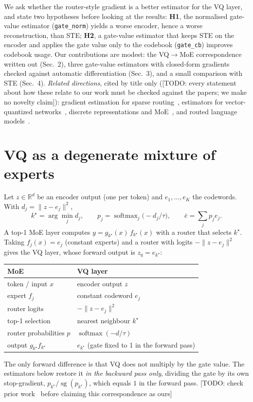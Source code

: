 \documentclass[11pt]{article}
\newcommand{\todo}[1]{{\color{red}[TODO: #1]}}
\newcommand{\sg}{\operatorname{sg}}
\newcommand{\est}[1]{\texttt{#1}}
\begin{document}
We ask whether the router-style gradient is a better estimator for the VQ layer, and state two
hypotheses before looking at the results: \textbf{H1}, the normalised gate-value estimator
(\est{gate\_norm}) yields a worse encoder, hence a worse reconstruction, than STE; \textbf{H2}, a
gate-value estimator that keeps STE on the encoder and applies the gate value only to the codebook
(\est{gate\_cb}) improves codebook usage. Our contributions are modest: the VQ$\to$MoE
correspondence written out (Sec.~2), three gate-value estimators with closed-form gradients checked
against automatic differentiation (Sec.~3), and a small comparison with STE (Sec.~4).
\emph{Related directions}, cited by title only (\todo{every statement about how these relate to our
work must be checked against the papers; we make no novelty claim}): gradient estimation for sparse
routing~\cite{liu2023sparsemixer,liu2024grin,panda2025defaultmoe}, estimators for vector-quantized
networks~\cite{huh2023straightening,fifty2024rotation}, discrete representations and
MoE~\cite{do2024vqmoe,zhong2026rqmoe}, and routed language models~\cite{clark2022unified}.

\section{VQ as a degenerate mixture of experts}
Let $z\in\mathbb{R}^d$ be an encoder output (one per token) and $e_1,\dots,e_K$ the codewords. With
$d_j=\lVert z-e_j\rVert^2$,
\begin{equation}
  k^\star=\arg\min_j d_j,\qquad p_j=\operatorname{softmax}_j\!\bigl(-d_j/\tau\bigr),\qquad
  \bar e=\sum_j p_j e_j .
\end{equation}
A top-1 MoE layer computes $y=g_{k^\star}(x)\,f_{k^\star}(x)$ with a router that selects $k^\star$.
Taking $f_j(x)=e_j$ (constant experts) and a router with logits $-\lVert z-e_j\rVert^2$ gives the VQ
layer, whose forward output is $z_q=e_{k^\star}$:
\begin{center}
\small
\begin{tabular}{ll}
\toprule
MoE & VQ layer \\
\midrule
token / input $x$ & encoder output $z$ \\
expert $f_j$ & constant codeword $e_j$ \\
router logits & $-\lVert z-e_j\rVert^2$ \\
top-1 selection & nearest neighbour $k^\star$ \\
router probabilities $p$ & $\operatorname{softmax}(-d/\tau)$ \\
output $g_{k^\star}f_{k^\star}$ & $e_{k^\star}$ (gate fixed to 1 in the forward pass) \\
\bottomrule
\end{tabular}
\end{center}
The only forward difference is that VQ does not multiply by the gate value. The estimators below
restore it \emph{in the backward pass only}, dividing the gate by its own stop-gradient,
$p_{k^\star}/\sg(p_{k^\star})$, which equals $1$ in the forward pass. \todo{check prior
work~\cite{do2024vqmoe,zhong2026rqmoe} before claiming this correspondence as ours}
\end{document}
